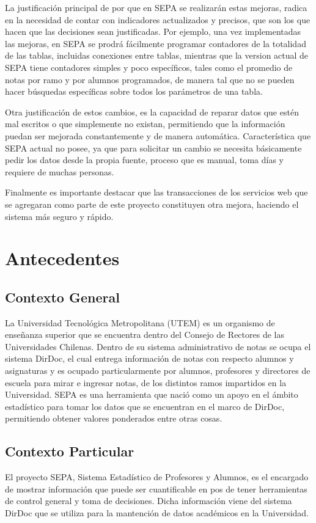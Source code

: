 \documentclass[a4paper,12pt,openany,oneside]{book}
\begin{document}
La justificación principal de por que en SEPA se realizarán estas mejoras, radica en la necesidad de contar con indicadores actualizados y precisos, que son los que hacen que las decisiones sean justificadas. Por ejemplo, una vez implementadas las mejoras, en SEPA se prodrá fácilmente programar contadores de la totalidad de las tablas, incluidas conexiones entre tablas, mientras que la version actual de SEPA tiene contadores simples y poco específicos, tales como el promedio de notas por ramo y por alumnos programados, de manera tal que no se pueden hacer búsquedas específicas sobre todos los parámetros de una tabla.

Otra justificación de estos cambios, es la capacidad de reparar datos que estén mal escritos o que simplemente no existan, permitiendo que la información puedan ser mejorada constantemente y de manera automática. Característica que SEPA actual no posee, ya que para solicitar un cambio se necesita básicamente pedir los datos desde la propia fuente, proceso que es manual, toma días y requiere de muchas personas. 

Finalmente es importante destacar que las transacciones de los servicios web que se agregaran como parte de este proyecto constituyen otra mejora, haciendo el sistema más seguro y rápido.

\chapter{Antecedentes}
\thispagestyle{empty}
\section{Contexto General}
La Universidad Tecnológica Metropolitana (UTEM) es un organismo de enseñanza superior que se encuentra dentro del Consejo de Rectores de las Universidades Chilenas. Dentro de su sistema administrativo de notas se ocupa el sistema DirDoc, el cual entrega información de notas con respecto alumnos y asignaturas y es ocupado particularmente por alumnos, profesores y directores de escuela para  mirar e ingresar notas, de los distintos ramos impartidos en la Universidad. SEPA es una herramienta que nació como un apoyo en el ámbito estadístico para tomar los datos que se encuentran en el marco de DirDoc, permitiendo obtener valores ponderados entre otras cosas.
\section{Contexto Particular}
El proyecto SEPA, Sistema Estadístico de Profesores y Alumnos, es el encargado de mostrar información que puede ser cuantificable en pos de tener herramientas de control general y toma de decisiones. Dicha información viene del sistema DirDoc que se utiliza para la mantención de datos académicos en la Universidad.
\end{document}
